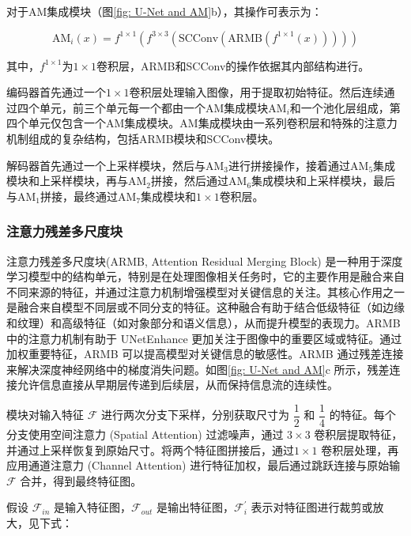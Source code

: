 \documentclass[a4paper]{ctexart}
\begin{document}
对于AM集成模块（图\ref{fig: U-Net and AM}b），其操作可表示为：

\begin{equation}
	\text{AM}_{i}(x) = f^{1 \times 1} \left(f^{3 \times 3} \left(\text{SCConv}\left( \text{ARMB} \left( f^{1 \times 1} (x)\right)\right)\right)\right)
\end{equation}

其中，$f^{1\times1}$为$1 \times 1$卷积层，ARMB和SCConv的操作依据其内部结构进行。

编码器首先通过一个$1 \times 1$卷积层处理输入图像，用于提取初始特征。然后连续通过四个单元，前三个单元每一个都由一个AM集成模块$\text{AM}_i$和一个池化层组成，第四个单元仅包含一个AM集成模块。AM集成模块由一系列卷积层和特殊的注意力机制组成的复杂结构，包括ARMB模块和SCConv模块。

解码器首先通过一个上采样模块，然后与$\text{AM}_{3}$进行拼接操作，接着通过$\text{AM}_{5}$集成模块和上采样模块，再与$\text{AM}_{2}$拼接，然后通过$\text{AM}_{6}$集成模块和上采样模块，最后与$\text{AM}_{1}$拼接，最终通过$\text{AM}_{7}$集成模块和$1 \times 1$卷积层。

\subsubsection{注意力残差多尺度块}

注意力残差多尺度块(ARMB, Attention Residual Merging Block) 是一种用于深度学习模型中的结构单元，特别是在处理图像相关任务时，它的主要作用是融合来自不同来源的特征，并通过注意力机制增强模型对关键信息的关注。其核心作用之一是融合来自模型不同层或不同分支的特征。这种融合有助于结合低级特征（如边缘和纹理）和高级特征（如对象部分和语义信息），从而提升模型的表现力。ARMB 中的注意力机制有助于 UNetEnhance 更加关注于图像中的重要区域或特征。通过加权重要特征，ARMB 可以提高模型对关键信息的敏感性。ARMB 通过残差连接来解决深度神经网络中的梯度消失问题。如图\ref{fig: U-Net and AM}c 所示，残差连接允许信息直接从早期层传递到后续层，从而保持信息流的连续性。

模块对输入特征 $\mathcal{F}$ 进行两次分支下采样，分别获取尺寸为 $\dfrac{1}{2}$ 和 $\dfrac{1}{4}$ 的特征。每个分支使用空间注意力 (Spatial Attention) 过滤噪声，通过 $3 \times 3$ 卷积层提取特征，并通过上采样恢复到原始尺寸。将两个特征图拼接后，通过$ 1 \times 1$ 卷积层处理，再应用通道注意力 (Channel Attention) 进行特征加权，最后通过跳跃连接与原始输 $\mathcal{F}$ 合并，得到最终特征图。

假设 $\mathcal{F}_{in}$ 是输入特征图，$\mathcal{F}_{out}$ 是输出特征图，$\mathcal{F}_{i}^\prime$ 表示对特征图进行裁剪或放大，见下式：
\end{document}
